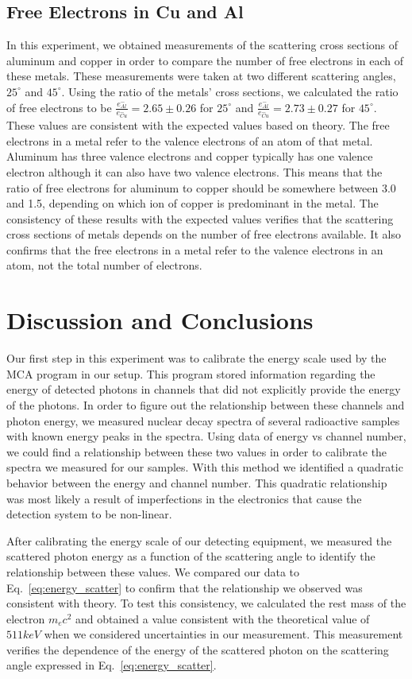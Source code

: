 \documentclass[%
 reprint,
 amsmath,amssymb,
 aps,
 pra,
]{revtex4-1}
\begin{document}
\subsection{Free Electrons in Cu and Al}
In this experiment, we obtained measurements of the scattering cross sections of aluminum and copper in order to compare the number of free electrons in each of these metals. These measurements were taken at two different scattering angles, $25^{\circ}$ and $45^{\circ}$. Using the ratio of the metals' cross sections, we calculated the ratio of free electrons to be $\frac{e^{-}_{Al}}{e^{-}_{Cu}} = 2.65 \pm 0.26$ for $25^{\circ}$ and $\frac{e^{-}_{Al}}{e^{-}_{Cu}} = 2.73 \pm 0.27$ for $45^{\circ}$. These values are consistent with the expected values based on theory. The free electrons in a metal refer to the valence electrons of an atom of that metal. Aluminum has three valence electrons and copper typically has one valence electron although it can also have two valence electrons. This means that the ratio of free electrons for aluminum to copper should be somewhere between 3.0 and 1.5, depending on which ion of copper is predominant in the metal. The consistency of these results with the expected values verifies that the scattering cross sections of metals depends on the number of free electrons available. It also confirms that the free electrons in a metal refer to the valence electrons in an atom, not the total number of electrons.

\section{Discussion and Conclusions}

Our first step in this experiment was to calibrate the energy scale used by the MCA program in our setup. This program stored information regarding the energy of detected photons in channels that did not explicitly provide the energy of the photons. In order to figure out the relationship between these channels and photon energy, we measured nuclear decay spectra of several radioactive samples with known energy peaks in the spectra. Using data of energy vs channel number, we could find a relationship between these two values in order to calibrate the spectra we measured for our samples. With this method we identified a quadratic behavior between the energy and channel number. This quadratic relationship was most likely a result of imperfections in the electronics that cause the detection system to be non-linear.

After calibrating the energy scale of our detecting equipment, we measured the scattered photon energy as a function of the scattering angle to identify the relationship between these values. We compared our data to Eq.~\ref{eq:energy_scatter} to confirm that the relationship we observed was consistent with theory. To test this consistency, we calculated the rest mass of the electron $m_{e}c^{2}$ and obtained a value consistent with the theoretical value of $511 keV$ when we considered uncertainties in our measurement. This measurement verifies the dependence of the energy of the scattered photon on the scattering angle expressed in Eq.~\ref{eq:energy_scatter}.
\end{document}

